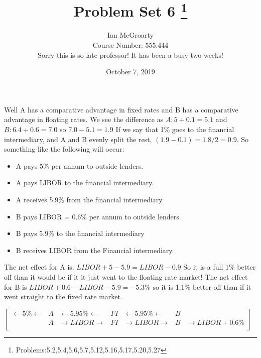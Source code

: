 \documentclass[12pt]{article}
\title{Problem Set 6 \thanks{Problems:5.2,5.4,5.6,5.7,5.12,5.16,5.17,5.20,5.27}}
\author{Ian McGroarty \\
	Course Number: 555.444 \\
Sorry this is so late professor! It has been a busy two weeks!}
\date{October 7, 2019}
\newenvironment{problem}[3][Problem]{\begin{trivlist}
\item[\hskip \labelsep {\bfseries #1}\hskip \labelsep {\bfseries #2.}]}{\end{trivlist}}
\begin{document}
\maketitle
\newpage
\begin{problem}{7.1}. Well A has a comparative advantage in fixed rates and B has a comparative advantage in floating rates. We see the difference as $A: 5+0.1 = 5.1$ and $B: 6.4 + 0.6 = 7.0$ so $7.0-5.1 = 1.9$ If we say that 1\% goes to the financial intermediary, and A and B evenly split the rest, $(1.9-0.1)=1.8/2=0.9$. So something like the following will occur: 
\begin{itemize}
\item A pays 5\% per annum to outside lenders. 
\item A pays LIBOR to the financial intermediary. 
\item A receives 5.9\% from the financial intermediary 
\item B pays LIBOR = 0.6\% per annum to outside lenders 
\item B pays 5.9\% to the financial intermediary 
\item B receives LIBOR from the Financial intermediary. 
\end{itemize}
The net effect for A is: $LIBOR + 5 -5.9 = LIBOR -0.9$ So it is a full 1\% better off than it would be if it it just went to the floating rate market! The net effect for B is $LIBOR +0.6 -LIBOR -5.9 = -5.3\%$ so it is 1.1\% better off than if it went straight to the fixed rate market. 

$\begin{bmatrix}
\leftarrow 5\% \leftarrow &A & \leftarrow 5.95\% \leftarrow & FI & \leftarrow 5.95\% \leftarrow & B & \\
 & A & \rightarrow LIBOR  \rightarrow & FI & \rightarrow LIBOR  \rightarrow & B & \rightarrow LIBOR + 0.6\% \\
\end{bmatrix}$
\end{problem}
\newpage
\end{document}
